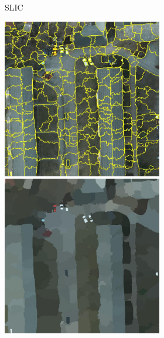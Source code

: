 \begin{figure}
\begin{subfigure}{\textwidth}
\begin{subfigure}{0.25\textwidth}
    \caption*{SLIC}
\end{subfigure}%
\begin{subfigure}{0.25\textwidth}
    \includegraphics[width=\textwidth]{Chapitre2/potsdam_quickshift}
    \includegraphics[width=\textwidth]{Chapitre2/potsdam_quickshift_patchwork}

\end{subfigure}
\end{subfigure}
\end{figure}

